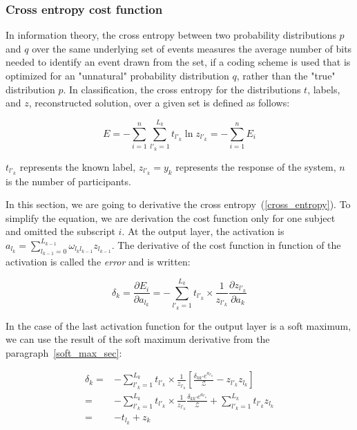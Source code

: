 \documentclass[final, paper=letter,5p,times,twocolumn]{elsarticle}
\begin{document}
\subsubsection{Cross entropy cost function}
\label{Cross_entropy_cost_function_sec}

In information theory, the cross entropy between two probability distributions $p$ and $q$ over the same underlying set of events measures the average number of bits needed to identify an event drawn from the set, if a coding scheme is used that is optimized for an "unnatural" probability distribution $q$, rather than the "true" distribution $p$. In classification, the cross entropy for the distributions $t$, labels, and $z$, reconstructed solution, over a given set is defined as follows:

\begin{equation}
  E = - \sum_{i = 1}^{n}\sum_{l'_{k} = 1}^{L_{k}} t_{l'_{k}} \ln z_{l'_{k}} =  - \sum_{i = 1}^{n} E_{i}
  \label{cross_entropy}
\end{equation}

$t_{l'_{k}}$ represents the known label, $z_{l'_{k}} = y_{k}$ represents the response of the system, $n$ is the number of participants. 

In this section, we are going to derivative the cross entropy~(\ref{cross_entropy}). To simplify the equation, we are derivation the cost function only for one subject and omitted the subscript $i$. At the output layer, the activation is $a_{l_{k}} = \sum_{l_{k-1} = 0}^{L_{k-1}} \omega_{l_{k}l_{k-1}} z_{l_{k-1}}$. The derivative of the cost function in function of the activation is called the {\it error} and is written:

\begin{equation}
  \delta_{k} = \frac{\partial E_{i}}{\partial a_{l_{k}}} = - \sum_{l'_{k} = 1}^{L_{k}} t_{l'_{k}} \times \frac{1}{z_{l'_{k}}} \frac{\partial z_{l'_{k}}}{\partial a_{k}}
  \label{cost_function_error}
\end{equation}

In the case of the last activation function for the output layer is a soft maximum, we can use the result of the soft maximum derivative from the paragraph~\ref{soft_max_sec}:

\begin{equation*}
  \begin{split}
    \delta_{k} = & - \sum_{l'_{k} = 1}^{L_{k}} t_{l'_{k}} \times \frac{1}{z_{l'_{k}}} \left \lbrack  \frac{\delta_{kk'} e^{a_{l'_{k}}}}{\mathcal{Z}} - z_{l'_{k}}z_{l_{k}} \right \rbrack \\
    = & - \sum_{l'_{k} = 1}^{L_{k}} t_{l'_{k}} \times \frac{1}{z_{l'_{k}}} \frac{\delta_{kk'} e^{a_{l'_{k}}}}{\mathcal{Z}} +  \sum_{l'_{k} = 1}^{L_{k}} t_{l'_{k}} z_{l_{k}} \\
    = & - t_{l_{k}} +  z_{k} \\
  \end{split}
\end{equation*}
\end{document}
